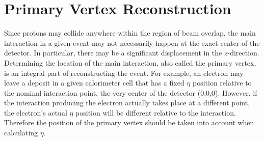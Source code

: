 \section{Primary Vertex Reconstruction} %
\label{evReco:PV}

Since protons may collide anywhere within the region of 
beam overlap, 
the main interaction in a given event may not necessarily 
happen at the exact center of the detector.  
In particular, there may be a significant displacement 
in the $z$-direction.  
Determining the location of the main interaction, 
also called the primary vertex, 
is an integral part of reconstructing the event.  
For example, an electron may leave a deposit in 
a given calorimeter cell that has a fixed $\eta$ position 
relative to the nominal interaction point, 
the very center of the detector (0,0,0).  
However, if the interaction producing the electron 
actually takes place at a different point, 
the electron's actual $\eta$ position will be 
different relative to the interaction.  
Therefore the position of the primary vertex 
should be taken into account when calculating $\eta$.  


